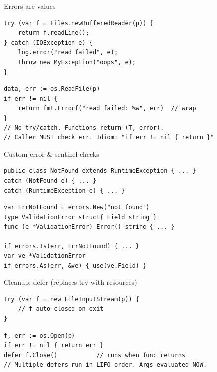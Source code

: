 \documentclass[10pt]{article}
\begin{document}
\begin{construct}{Errors are values}
\noindent
\begin{minipage}[t]{0.485\linewidth}
\begin{lstlisting}[style=java, title=Java]
try (var f = Files.newBufferedReader(p)) {
    return f.readLine();
} catch (IOException e) {
    log.error("read failed", e);
    throw new MyException("oops", e);
}
\end{lstlisting}
\end{minipage}\hfill
\begin{minipage}[t]{0.485\linewidth}
\begin{lstlisting}[style=go, title=Go]
data, err := os.ReadFile(p)
if err != nil {
    return fmt.Errorf("read failed: %w", err)  // wrap
}
// No try/catch. Functions return (T, error).
// Caller MUST check err. Idiom: "if err != nil { return }"
\end{lstlisting}
\end{minipage}
\end{construct}

\begin{construct}{Custom error \& sentinel checks}
\noindent
\begin{minipage}[t]{0.485\linewidth}
\begin{lstlisting}[style=java, title=Java]
public class NotFound extends RuntimeException { ... }
catch (NotFound e) { ... }
catch (RuntimeException e) { ... }
\end{lstlisting}
\end{minipage}\hfill
\begin{minipage}[t]{0.485\linewidth}
\begin{lstlisting}[style=go, title=Go]
var ErrNotFound = errors.New("not found")
type ValidationError struct{ Field string }
func (e *ValidationError) Error() string { ... }

if errors.Is(err, ErrNotFound) { ... }
var ve *ValidationError
if errors.As(err, &ve) { use(ve.Field) }
\end{lstlisting}
\end{minipage}
\end{construct}

\begin{construct}{Cleanup: defer (replaces try-with-resources)}
\noindent
\begin{minipage}[t]{0.485\linewidth}
\begin{lstlisting}[style=java, title=Java]
try (var f = new FileInputStream(p)) {
    // f auto-closed on exit
}
\end{lstlisting}
\end{minipage}\hfill
\begin{minipage}[t]{0.485\linewidth}
\begin{lstlisting}[style=go, title=Go]
f, err := os.Open(p)
if err != nil { return err }
defer f.Close()           // runs when func returns
// Multiple defers run in LIFO order. Args evaluated NOW.
\end{lstlisting}
\end{minipage}
\end{construct}
\end{document}
